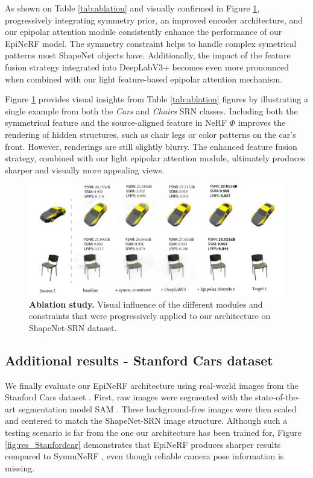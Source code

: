 As shown on Table \ref{tab:ablation} and visually confirmed in Figure \ref{fig:ablation}, progressively integrating symmetry prior, an improved encoder architecture, and our epipolar attention module consistently enhance the performance of our EpiNeRF model. The symmetry constraint helps to handle complex symetrical patterns most ShapeNet objects have. Additionally, the impact of the feature fusion strategy integrated into DeepLabV3+ becomes even more pronounced when combined with our light feature-based epipolar attention mechanism. 

Figure \ref{fig:ablation} provides visual insights from Table \ref{tab:ablation} figures by illustrating a single example from both the \textit{Cars} and \textit{Chairs} SRN classes. Including both the symmetrical feature and the source-aligned feature in NeRF $\Phi$ improves the rendering of hidden structures, such as chair legs or color patterns on the car’s front. However, renderings are still slightly blurry. The enhanced feature fusion strategy, combined with our light epipolar attention module, ultimately produces sharper and visually more appealing views. \newline 


\begin{figure}[h!]
    \begin{center}
  \includegraphics[width=\linewidth]{images/epinerf/supp_ablation_illustration.png}
  \caption{\textbf{Ablation study.} Visual influence of the different modules and constraints that were progressively applied to our architecture on ShapeNet-SRN dataset.}
  \label{fig:ablation}
  \end{center}
\end{figure}  


\subsection{Additional results - Stanford Cars dataset }
We finally evaluate our EpiNeRF architecture using real-world images from the Stanford Cars dataset  \citep{krause20133d}. First, raw images were segmented with the state-of-the-art segmentation model SAM \citep{kirillov2023segment}. These background-free images were then scaled and centered to match the ShapeNet-SRN image structure. Although such a testing scenario is far from the one our architecture has been trained for, Figure \ref{fig:res_Stanfordcar} demonstrates that EpiNeRF produces sharper results compared to SymmNeRF \citep{li2022symmnerf}, even though reliable camera pose information is missing.


